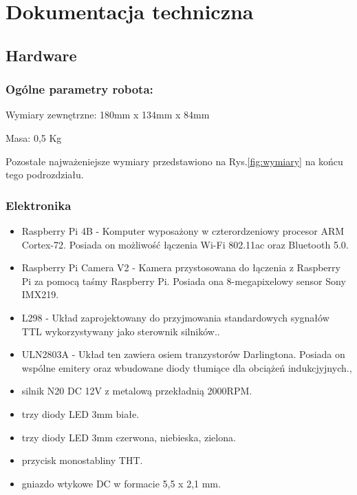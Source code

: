 \section{Dokumentacja techniczna}
\subsection{Hardware}
\label{subsec:hardware}
\subsubsection{Ogólne parametry robota:}
Wymiary zewnętrzne: 180mm x  134mm x 84mm

Masa: 0,5 Kg

Pozostałe najważeniejsze wymiary przedstawiono na Rys.\ref{fig:wymiary} na końcu tego podrozdziału.

\subsubsection{Elektronika}
    \begin{itemize}
        \item Raspberry Pi 4B - Komputer wyposażony w czterordzeniowy procesor ARM Cortex-72. Posiada on możliwość łączenia Wi-Fi 802.11ac oraz Bluetooth 5.0. \cite{malina}
        \item Raspberry Pi Camera V2 - Kamera przystosowana do łączenia z Raspberry Pi za pomocą taśmy Raspberry Pi. Posiada ona 8-megapixelowy sensor Sony IMX219. \cite{malina}
        \item L298 - Układ zaprojektowany do przyjmowania standardowych sygnałów TTL wykorzystywany jako sterownik silników.\cite{L298}.
        \item ULN2803A - Układ ten zawiera osiem tranzystorów Darlingtona. Posiada on wspólne emitery oraz wbudowane diody tłumiące dla obciążeń indukcjyjnych.\cite{ULN2803a},
        \item silnik N20 DC 12V z metalową przekładnią 2000RPM.
        \item trzy diody LED 3mm białe.
        \item trzy diody LED 3mm czerwona, niebieska, zielona.
        \item przycisk monostabliny THT.
        \item gniazdo wtykowe DC w formacie 5,5 x 2,1 mm.
    \end{itemize}

